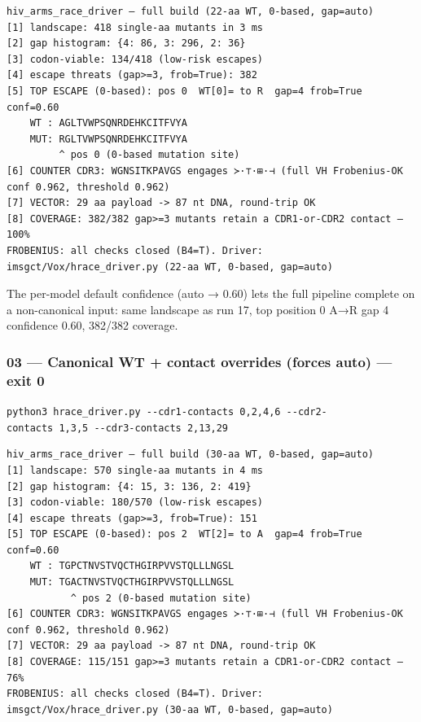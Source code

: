 \documentclass[12pt,a4paper]{article}
\begin{document}
\begin{verbatim}
hiv_arms_race_driver — full build (22-aa WT, 0-based, gap=auto)
[1] landscape: 418 single-aa mutants in 3 ms
[2] gap histogram: {4: 86, 3: 296, 2: 36}
[3] codon-viable: 134/418 (low-risk escapes)
[4] escape threats (gap>=3, frob=True): 382
[5] TOP ESCAPE (0-based): pos 0  WT[0]= to R  gap=4 frob=True conf=0.60
    WT : AGLTVWPSQNRDEHKCITFVYA
    MUT: RGLTVWPSQNRDEHKCITFVYA
         ^ pos 0 (0-based mutation site)
[6] COUNTER CDR3: WGNSITKPAVGS engages ≻·⊤·⊞·⊣ (full VH Frobenius-OK conf 0.962, threshold 0.962)
[7] VECTOR: 29 aa payload -> 87 nt DNA, round-trip OK
[8] COVERAGE: 382/382 gap>=3 mutants retain a CDR1-or-CDR2 contact — 100%
FROBENIUS: all checks closed (B4=T). Driver: imsgct/Vox/hrace_driver.py (22-aa WT, 0-based, gap=auto)
\end{verbatim}

The per-model default confidence (auto → 0.60) lets the full pipeline
complete on a non-canonical input: same landscape as run 17, top
position 0 A→R gap 4 confidence 0.60, 382/382 coverage.

\hypertarget{canonical-wt-contact-overrides-forces-auto-exit-0}{%
\subsubsection{03 --- Canonical WT + contact overrides (forces auto) ---
exit 0}\label{canonical-wt-contact-overrides-forces-auto-exit-0}}

\texttt{python3\ hrace\_driver.py\ -\/-cdr1-contacts\ 0,2,4,6\ -\/-cdr2-contacts\ 1,3,5\ -\/-cdr3-contacts\ 2,13,29}

\begin{verbatim}
hiv_arms_race_driver — full build (30-aa WT, 0-based, gap=auto)
[1] landscape: 570 single-aa mutants in 4 ms
[2] gap histogram: {4: 15, 3: 136, 2: 419}
[3] codon-viable: 180/570 (low-risk escapes)
[4] escape threats (gap>=3, frob=True): 151
[5] TOP ESCAPE (0-based): pos 2  WT[2]= to A  gap=4 frob=True conf=0.60
    WT : TGPCTNVSTVQCTHGIRPVVSTQLLLNGSL
    MUT: TGACTNVSTVQCTHGIRPVVSTQLLLNGSL
           ^ pos 2 (0-based mutation site)
[6] COUNTER CDR3: WGNSITKPAVGS engages ≻·⊤·⊞·⊣ (full VH Frobenius-OK conf 0.962, threshold 0.962)
[7] VECTOR: 29 aa payload -> 87 nt DNA, round-trip OK
[8] COVERAGE: 115/151 gap>=3 mutants retain a CDR1-or-CDR2 contact — 76%
FROBENIUS: all checks closed (B4=T). Driver: imsgct/Vox/hrace_driver.py (30-aa WT, 0-based, gap=auto)
\end{verbatim}
\end{document}
